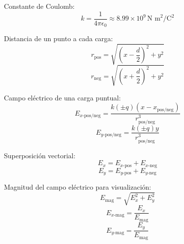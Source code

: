 Constante de Coulomb:
\begin{equation}
    k = \frac{1}{4\pi\epsilon_0} \approx 8.99 \times 10^9 \, \text{N m}^2/\text{C}^2
\end{equation}

Distancia de un punto a cada carga:
\begin{equation}
    r_{\text{pos}} = \sqrt{(x - \frac{d}{2})^2 + y^2}
\end{equation}
\begin{equation}
    r_{\text{neg}} = \sqrt{(x + \frac{d}{2})^2 + y^2}
\end{equation}

Campo eléctrico de una carga puntual:
\begin{equation}
    E_{x\text{-pos/neg}} = \frac{k(\pm q)(x-x_{\text{pos/neg}})}{r_{\text{pos/neg}}^3}
\end{equation}
\begin{equation}
    E_{y\text{-pos/neg}} = \frac{k(\pm q)y}{r_{\text{pos/neg}}^3}
\end{equation}

Superposición vectorial:
\begin{equation}
    E_x = E_{x\text{-pos}} + E_{x\text{-neg}}
\end{equation}
\begin{equation}
    E_y = E_{y\text{-pos}} + E_{y\text{-neg}}
\end{equation}

Magnitud del campo eléctrico para visualización:
\begin{equation}
    E_{\text{mag}} = \sqrt{E_x^2 + E_y^2}
\end{equation}
\begin{equation}
    E_{x\text{-mag}} = \frac{E_x}{E_{\text{mag}}}
\end{equation}
\begin{equation}
    E_{y\text{-mag}} = \frac{E_y}{E_{\text{mag}}}
\end{equation}
